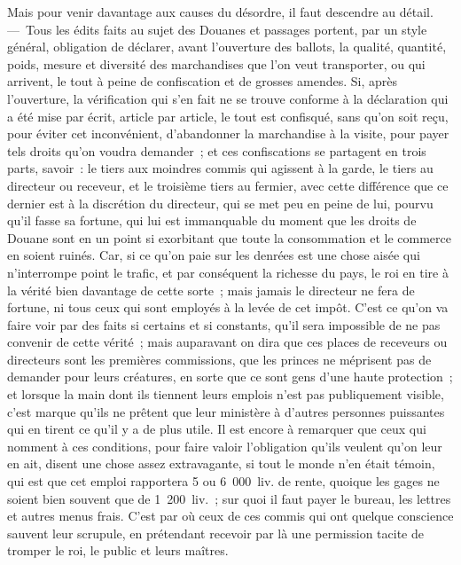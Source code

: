 \documentclass[french,twoside]{book} %
\begin{document}
Mais pour venir davantage aux causes du désordre, il faut descendre au détail. — Tous les édits faits au sujet des Douanes et passages portent, par un style général, obligation de déclarer, avant l’ouverture des ballots, la qualité, quantité, poids, mesure et diversité des marchandises que l’on veut transporter, ou qui arrivent, le tout à peine de confiscation et de grosses amendes. Si, après l’ouverture, la vérification qui s’en fait ne se trouve conforme à la déclaration qui a été mise par écrit, article par article, le tout est confisqué, sans qu’on soit reçu, pour éviter cet inconvénient, d’abandonner la marchandise à la visite, pour payer tels droits qu’on voudra demander ; et ces confiscations se partagent en trois parts, savoir : le tiers aux moindres commis qui agissent à la garde, le tiers au directeur ou receveur, et le troisième tiers au fermier, avec cette différence que ce dernier est à la discrétion du directeur, qui se met peu en peine de lui, pourvu qu’il fasse sa fortune, qui lui est immanquable du moment que les droits de Douane sont en un point si exorbitant que toute la consommation et le commerce en soient ruinés. Car, si ce qu’on paie sur les denrées est une chose aisée qui n’interrompe point le trafic, et par conséquent la richesse du pays, le roi en tire à la vérité bien davantage de cette sorte ; mais jamais le directeur ne fera de fortune, ni tous ceux qui sont employés à la levée de cet impôt. C’est ce qu’on va faire voir par des faits si certains et si constants, qu’il sera impossible de ne pas convenir de cette vérité ; mais auparavant on dira que ces places de receveurs ou directeurs sont les premières commissions, que les princes ne méprisent pas de demander pour leurs créatures, en sorte que ce sont gens d’une haute protection ; et lorsque la main dont ils tiennent leurs emplois n’est pas publiquement visible, c’est marque qu’ils ne prêtent que leur ministère à d’autres personnes puissantes qui en tirent ce qu’il y a de plus utile. Il est encore à remarquer que ceux qui nomment à ces conditions, pour faire valoir l’obligation qu’ils veulent qu’on leur en ait, disent une chose assez extravagante, si tout le monde n’en était témoin, qui est que cet emploi rapportera 5 ou 6 000 liv. de rente, quoique les gages ne soient bien souvent que de 1 200 liv. ; sur quoi il faut payer le bureau, les lettres et autres menus frais. C’est par où ceux de ces commis qui ont quelque conscience sauvent leur scrupule, en prétendant recevoir par là une permission tacite de tromper le roi, le public et leurs maîtres.
\end{document}
